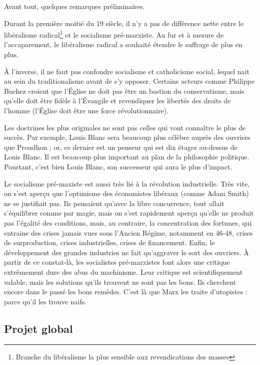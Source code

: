 \documentclass[12pt]{report}
\begin{document}

Avant tout, quelques remarques préliminaires.

Durant la première moitié du 19 siècle, il n'y a pas de différence nette entre le libéralisme radical\footnote{Branche du libéralisme la plus sensible aux revendications des masses} et le socialisme pré-marxiste. Au fur et à mesure de l'accaparement, le libéralisme radical a souhaité étendre le suffrage de plus en plus. 

À l'inverse, il ne faut pas confondre socialisme et catholicisme social, lequel nait au sein du traditionalisme avant de s'y opposer. Certains acteurs comme Philippe Buchez croient que l'Église ne doit pas être un bastion du conservatisme, mais qu'elle doit être fidèle à l'Évangile et revendiquer les libertés des droits de l'homme (l'Église doit être une force révolutionnaire).

Les doctrines les plus originales ne sont pas celles qui vont connaître le plus de succès. Par exemple, Louis Blanc sera beaucoup plus célèbre auprès des ouvriers que Proudhon ; or, ce dernier est un penseur qui est dix étages au-dessus de Louis Blanc. Il est beaucoup plus important au plan de la philosophie politique. Pourtant, c'est bien Louis Blanc, son successeur qui aura le plus d'impact.

Le socialisme pré-maxiste est aussi très lié à la révolution industrielle. Très vite, on s'est aperçu que l'optimisme des économistes libéraux (comme Adam Smith) ne se justifiait pas. Ils pensaient qu'avec la libre concurrence, tout allait s'équilibrer comme par magie, mais on s'est rapidement aperçu qu'elle ne produit pas l'égalité des conditions, mais, au contraire, la concentration des fortunes, qui entraine des crises jamais vues sous l'Ancien Régime, notamment en 46-48, crises de surproduction, crises industrielles, crises de financement. Enfin, le développement des grandes industries ne fait qu'aggraver le sort des ouvriers. À partir de ce constat-là, les socialistes pré-marxistes font alors une critique extrêmement dure des abus du machinisme. Leur critique est scientifiquement valable, mais les solutions qu'ils trouvent ne sont pas les bons. Ils cherchent encore dans le passé les bons remèdes. C'est là que Marx les traite d'utopistes : parce qu'il les trouve naifs.

\subsection{Projet global}
\end{document}
